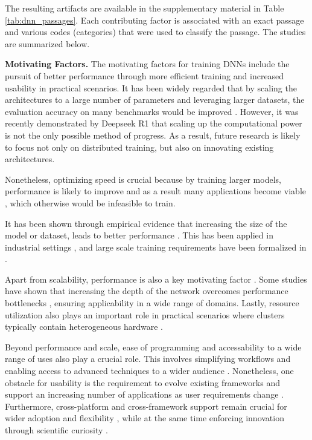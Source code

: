 


The resulting artifacts are available in the supplementary material in Table
\ref{tab:dnn_passages}. Each contributing factor is associated with an exact passage and various
codes (categories) that were used to classify the passage. The studies are summarized below.

\textbf{Motivating Factors.}
The motivating factors for training DNNs include the pursuit of better performance through more
efficient training and increased usability in practical scenarios. It has been widely regarded that
by scaling the architectures to a large number of parameters and leveraging larger datasets, the
evaluation accuracy on many benchmarks would be improved \cite{hestness_deep_2017}. However, it was
recently demonstrated by Deepseek R1
\cite{deepseekai2025deepseekr1incentivizingreasoningcapability} that scaling up the computational
power is not the only possible method of progress. As a result, future research is likely to focus
not only on distributed training, but also on innovating existing architectures.

Nonetheless, optimizing speed is crucial because by training larger models, performance is likely
to improve  and as a result many applications become viable , which
otherwise would be infeasible to train.

It has been shown through empirical evidence that increasing the size of the model or dataset,
leads to better performance . This has been applied in industrial settings
, and large scale training requirements have been formalized in
.

Apart from scalability, performance is also a key motivating factor . Some
studies have shown that increasing the depth of the network overcomes performance bottlenecks
, ensuring applicability in a wide range of domains. Lastly, resource utilization
also plays an important role in practical scenarios where clusters typically contain heterogeneous
hardware .

Beyond performance and scale, ease of programming and accessability to a wide range of uses also
play a crucial role. This involves simplifying workflows and enabling access to advanced techniques
to a wider audience . Nonetheless, one obstacle for usability is the
requirement to evolve existing frameworks and support an increasing number of applications as user
requirements change . Furthermore, cross-platform and cross-framework support remain
crucial for wider adoption and flexibility , while at the same time enforcing
innovation through scientific curiosity .


